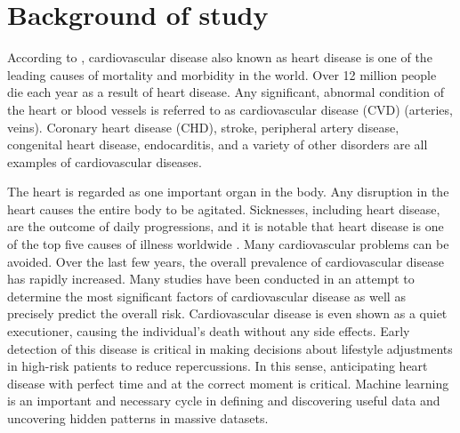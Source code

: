 

\section{Background of study}
According to , cardiovascular disease also known as heart disease is one of the leading causes of mortality and morbidity in the world. Over 12 million people die each year as a result of heart disease. Any significant, abnormal condition of the heart or blood vessels is referred to as cardiovascular disease (CVD) (arteries, veins). Coronary heart disease (CHD), stroke, peripheral artery disease, congenital heart disease, endocarditis, and a variety of other disorders are all examples of cardiovascular diseases.

The heart is regarded as one important organ in the body. Any disruption in the heart causes the entire body to be agitated. Sicknesses, including heart disease, are the outcome of daily progressions, and it is notable that heart disease is one of the top five causes of illness worldwide \citep{2021Cardiovascular}. Many cardiovascular problems can be avoided. Over the last few years, the overall prevalence of cardiovascular disease has rapidly increased. Many studies have been conducted in an attempt to determine the most significant factors of cardiovascular disease as well as precisely predict the overall risk. Cardiovascular disease is even shown as a quiet executioner, causing the individual's death without any side effects. Early detection of this disease is critical in making decisions about lifestyle adjustments in high-risk patients to reduce repercussions. In this sense, anticipating heart disease with perfect time and at the correct moment is critical. Machine learning is an important and necessary cycle in defining and discovering useful data and uncovering hidden patterns in massive datasets.

